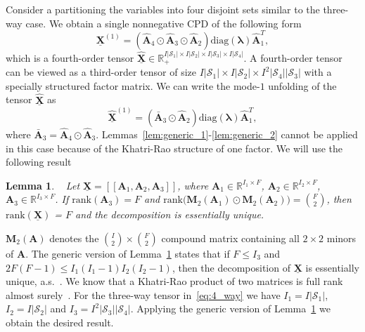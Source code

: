 \documentclass[journal]{IEEEtran}
\newtheorem{Lemma}{Lemma}
\begin{document}
\begin{appendices}
Consider a partitioning the variables into four disjoint sets similar to the  {three-way} case. We obtain a single nonnegative CPD of the following form
\begin{equation*}
\underline{\mathbf{X}}^{(1)} = (\widehat{\mathbf{A}}_4 \odot \widehat{\mathbf{A}}_3 \odot \widehat{\mathbf{A}}_2) \textrm{diag}(\boldsymbol{\lambda})\widehat{\mathbf{A}}_1^T,
\end{equation*} 
which is a fourth-order tensor $\underline{\widehat{\mathbf{X}}} \in \mathbb{R}_+^{I |\mathcal{S}_1| \times I |\mathcal{S}_2| \times I |\mathcal{S}_3| \times I |\mathcal{S}_4|}$. A fourth-order tensor can be viewed as a third-order tensor of size $I|\mathcal{S}_1|\times I|\mathcal{S}_2|\times I^2|\mathcal{S}_4||\mathcal{S}_3|$ with a specially structured factor matrix. We can write the mode-$1$ unfolding of the tensor $\underline{\widehat{\mathbf{X}}}$ as
\begin{equation}
\underline{\widehat{ \mathbf{X}} }^{(1)} = ( \bar{\mathbf{A}}_3 \odot \widehat{\mathbf{A}}_2) \textrm{diag}(\boldsymbol{\lambda})\widehat{\mathbf{A}}_1^T,
\label{eq:4_way}
\end{equation} 
where $\bar{\mathbf{A}}_3 = \widehat{\mathbf{A}}_4 \odot \widehat{\mathbf{A}}_3 $.
Lemmas~\ref{lem:generic_1}-\ref{lem:generic_2} cannot be applied in this case because of the Khatri-Rao structure of one factor. We will use the following result
\begin{Lemma}~\cite{JiSi2004} \label{thm:jisi2004} Let $\underline{\mathbf{X}} = [\![ \mathbf{A}_1,\mathbf{A}_2,\mathbf{A}_3 ]\!]$, where $\mathbf{A}_1 \in \mathbb{R}^{I_1 \times F}$, $\mathbf{A}_2 \in \mathbb{R}^{I_2 \times F}$, $\mathbf{A}_3 \in \mathbb{R}^{I_3 \times F}$. If $\textrm{rank}(\mathbf{A}_3)=F$ and $\textrm{rank} \big(\mathbf{M}_2(\mathbf{A}_1) \odot \mathbf{M}_2(\mathbf{A}_2) \big ) = \binom{F}{2}$, then $\textrm{rank}(\underline{\mathbf{X}})$ = $F$ and the decomposition is essentially unique.
\end{Lemma}

$\mathbf{M}_2(\mathbf{A})$ denotes the $\binom{I}{2}\times\binom{F}{2}$ compound matrix containing all $2\times 2$ minors of $\mathbf{A}$. The generic version of Lemma~\ref{thm:jisi2004} states that if $F \leq I_3$ and $2F(F-1) \leq I_1 (I_1 -1)I_2(I_2-1)$, then the decomposition of $\underline{\mathbf{X}}$ is essentially unique, a.s.~\cite{SteBeLa2006}. We know that a Khatri-Rao product of two matrices is full rank almost surely~\cite[Corollary 1]{JiSi2001}. For the {three-way} tensor in~\eqref{eq:4_way} we have $I_1 = I |\mathcal{S}_1|$, $I_2 = I |\mathcal{S}_2|$ and $I_3 = I^2 |\mathcal{S}_3| |\mathcal{S}_4|$. Applying the generic version of Lemma~\ref{thm:jisi2004} we obtain the desired result.


\end{appendices}
\end{document}

